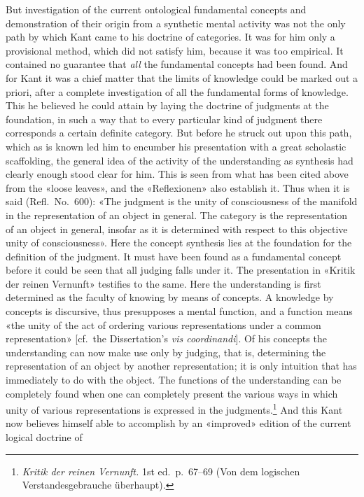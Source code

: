 \documentclass[12pt,a4paper]{article}
\newcommand{\opage}[1]{\marginnote{\footnotesize\textit{[#1]}}}
\begin{document}
But investigation of the current ontological fundamental concepts and
demonstration of their origin from a synthetic mental activity was not the
only path by which Kant came to his doctrine of categories. It was for him
only a provisional method, which did not satisfy him, because it was too
empirical. It contained no guarantee that \emph{all} the fundamental concepts had
been found. And for Kant it was a chief matter that the limits of knowledge
could be marked out a priori, after a complete investigation of all the
fundamental forms of knowledge. This he believed he could attain by laying
the doctrine of judgments at the foundation, in such a way that to every
particular kind of judgment there corresponds a certain definite category.
But before he struck out upon this path, which as is known led him to encumber
his presentation with a great scholastic scaffolding, the general idea of the
activity of the understanding as synthesis had clearly enough stood clear for
him. This is seen from what has been cited above from the «loose leaves», and
the «Reflexionen» also establish it. Thus when it is said (Refl.\ No.\ 600):
«The judgment is the unity of consciousness of the manifold in the
representation of an object in general. The category is the representation of
an object in general, insofar as it is determined with respect to this
objective unity of consciousness». Here the concept synthesis lies at the
foundation for the definition of the judgment. It must have been found as a
fundamental concept \opage{55}before it could be seen that all judging falls under it.
The presentation in «Kritik der reinen Vernunft» testifies to the same. Here
the understanding is first determined as the faculty of knowing by means of
concepts. A knowledge by concepts is discursive, thus presupposes a mental
function, and a function means «the unity of the act of ordering various
representations under a common representation» [cf.\ the Dissertation's
\textit{vis coordinandi}]. Of his concepts the understanding can now make use
only by judging, that is, determining the representation of an object by
another representation; it is only intuition that has immediately to do with
the object. The functions of the
understanding can be completely found when one can completely present the
various ways in which unity of various representations is expressed in the
judgments.\footnote{\textit{Kritik der reinen Vernunft.} 1st ed.\ p.\ 67--69
(Von dem logischen Verstandesgebrauche überhaupt).} And this Kant now believes himself able to accomplish by an
«improved» edition of the current logical doctrine of
\end{document}
